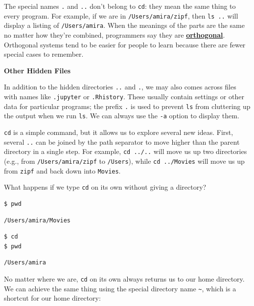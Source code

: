 \documentclass[
]{krantz}
\renewenvironment{quote}{\begin{VF}}{\end{VF}}
\newcommand{\gref}[2]{\hyperlink{#2}{\textbf{#1}}}
\begin{document}
The special names \texttt{.} and \texttt{..} don't belong to \texttt{cd}:
they mean the same thing to every program.
For example,
if we are in \texttt{/Users/amira/zipf},
then \texttt{ls~..} will display a listing of \texttt{/Users/amira}.
When the meanings of the parts are the same no matter how they're combined,
programmers say they are \gref{orthogonal}{orthogonality}.
Orthogonal systems tend to be easier for people to learn
because there are fewer special cases to remember.

\begin{quote}
\textbf{Other Hidden Files}

In addition to the hidden directories \texttt{..} and \texttt{.},
we may also comes across files with names like \texttt{.jupyter} or \texttt{.Rhistory}.
These usually contain settings or other data for particular programs;
the prefix \texttt{.} is used to prevent \texttt{ls} from cluttering up the output
when we run \texttt{ls}.
We can always use the \texttt{-a} option to display them.
\end{quote}

\texttt{cd} is a simple command,
but it allows us to explore several new ideas.
First,
several \texttt{..} can be joined by the path separator
to move higher than the parent directory in a single step.
For example, \texttt{cd~../..} will move us up two directories
(e.g., from \texttt{/Users/amira/zipf} to \texttt{/Users}),
while \texttt{cd~../Movies} will move us up from \texttt{zipf} and back down into \texttt{Movies}.

What happens if we type \texttt{cd} on its own without giving a directory?

\begin{verbatim}
$ pwd
\end{verbatim}

\begin{verbatim}
/Users/amira/Movies
\end{verbatim}

\begin{verbatim}
$ cd
$ pwd
\end{verbatim}

\begin{verbatim}
/Users/amira
\end{verbatim}

No matter where we are,
\texttt{cd} on its own always returns us to our home directory.
We can achieve the same thing using the special directory name \texttt{\textasciitilde{}},
which is a shortcut for our home directory:
\end{document}
